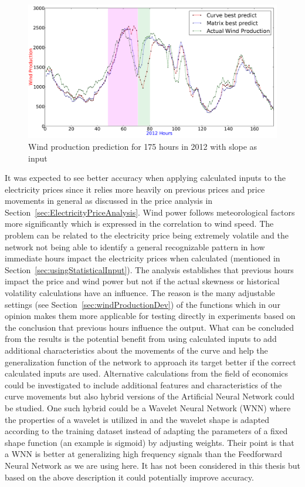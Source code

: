 \begin{figure}[H]
\centering
\includegraphics[width=0.99\linewidth]{billeder/curveAnalysisWindProduction.png}
\caption{Wind production prediction for 175 hours in 2012 with slope as input}
\label{fig:basicCurveAnalysisGraphoForDiscussion}
\end{figure}

It was expected to see better accuracy when applying calculated inputs to the electricity prices since it relies more heavily on previous prices and price movements in general as discussed in the price analysis in Section~\ref{sec:ElectricityPriceAnalysis}. Wind power follows meteorological factors more significantly which is expressed in the correlation to wind speed. The problem can be related to the electricity price being extremely volatile and the network not being able to identify a general recognizable pattern in how immediate hours impact the electricity prices when calculated (mentioned in Section~\ref{sec:usingStatisticalInput}). The analysis establishes that previous hours impact the price and wind power but not if the actual skewness or historical volatility calculations have an influence. The reason is the many adjustable settings (see Section~\ref{sec:windProductionDev}) of the functions which in our opinion makes them more applicable for testing directly in experiments based on the conclusion that previous hours influence the output. What can be concluded from the results is the potential benefit from using calculated inputs to add additional characteristics about the movements of the curve and help the generalization function of the network to approach its target better if the correct calculated inputs are used. Alternative calculations from the field of economics could be investigated to include additional features and characteristics of the curve movements but also hybrid versions of the Artificial Neural Network could be studied. One such hybrid could be a Wavelet Neural Network (WNN) where the properties of a wavelet is utilized in \cite{adaptiveWaveletANNElectricityMarkets} and the wavelet shape is adapted according to the training dataset instead of adapting the parameters of a fixed shape function (an example is sigmoid) by adjusting weights. Their point is that a WNN is better at generalizing high frequency signals than the Feedforward Neural Network as we are using here. It has not been considered in this thesis but based on the above description it could potentially improve accuracy. 
